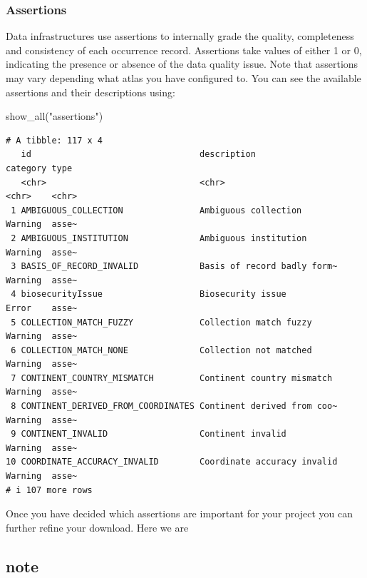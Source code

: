 \documentclass[
  letterpaper,
  DIV=11,
  numbers=noendperiod,
  oneside]{scrreprt}
\newenvironment{Shaded}{\begin{snugshade}}{\end{snugshade}}
\newcommand{\FunctionTok}[1]{\textcolor[rgb]{0.28,0.35,0.67}{#1}}
\newcommand{\NormalTok}[1]{\textcolor[rgb]{0.00,0.23,0.31}{#1}}
\newcommand{\StringTok}[1]{\textcolor[rgb]{0.13,0.47,0.30}{#1}}
\begin{document}
\hypertarget{assertions}{%
\subsubsection{Assertions}\label{assertions}}

Data infrastructures use assertions to internally grade the quality,
completeness and consistency of each occurrence record. Assertions take
values of either 1 or 0, indicating the presence or absence of the data
quality issue. Note that assertions may vary depending what atlas you
have configured to. You can see the available assertions and their
descriptions using:

\begin{Shaded}
\begin{Highlighting}[]
\FunctionTok{show\_all}\NormalTok{(}\StringTok{"assertions"}\NormalTok{) }
\end{Highlighting}
\end{Shaded}

\begin{verbatim}
# A tibble: 117 x 4
   id                                 description                 category type 
   <chr>                              <chr>                       <chr>    <chr>
 1 AMBIGUOUS_COLLECTION               Ambiguous collection        Warning  asse~
 2 AMBIGUOUS_INSTITUTION              Ambiguous institution       Warning  asse~
 3 BASIS_OF_RECORD_INVALID            Basis of record badly form~ Warning  asse~
 4 biosecurityIssue                   Biosecurity issue           Error    asse~
 5 COLLECTION_MATCH_FUZZY             Collection match fuzzy      Warning  asse~
 6 COLLECTION_MATCH_NONE              Collection not matched      Warning  asse~
 7 CONTINENT_COUNTRY_MISMATCH         Continent country mismatch  Warning  asse~
 8 CONTINENT_DERIVED_FROM_COORDINATES Continent derived from coo~ Warning  asse~
 9 CONTINENT_INVALID                  Continent invalid           Warning  asse~
10 COORDINATE_ACCURACY_INVALID        Coordinate accuracy invalid Warning  asse~
# i 107 more rows
\end{verbatim}

Once you have decided which assertions are important for your project
you can further refine your download. Here we are

\hypertarget{note}{%
\subsection{note}\label{note}}
\end{document}
